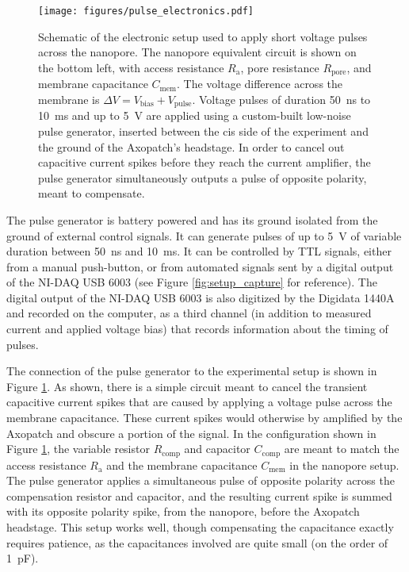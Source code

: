\begin{figure}[h]
\begin{centering}
\texttt{[image: figures/pulse\_electronics.pdf]}
\caption[Electronic setup for low-noise pulses across a nanopore]{Schematic of the electronic setup used to apply short voltage pulses across the nanopore.  The nanopore equivalent circuit is shown on the bottom left, with access resistance $R_{\text{a}}$, pore resistance $R_{\text{pore}}$, and membrane capacitance $C_{\text{mem}}$.  The voltage difference across the membrane is $\Delta V = V_{\text{bias}} + V_{\text{pulse}}$.  Voltage pulses of duration \SI{50}{\ns} to \SI{10}{\ms} and up to \SI{5}{\V} are applied using a custom-built low-noise pulse generator, inserted between the cis side of the experiment and the ground of the Axopatch's headstage.  In order to cancel out capacitive current spikes before they reach the current amplifier, the pulse generator simultaneously outputs a pulse of opposite polarity, meant to compensate.}
\label{fig:helicase_pulse_setup}
\end{centering}
\end{figure}

The pulse generator is battery powered and has its ground isolated from the ground of external control signals.  It can generate pulses of up to \SI{5}{\V} of variable duration between \SI{50}{\ns} and \SI{10}{\ms}.  It can be controlled by TTL signals, either from a manual push-button, or from automated signals sent by a digital output of the NI-DAQ USB 6003 (see Figure \ref{fig:setup_capture} for reference).  The digital output of the NI-DAQ USB 6003 is also digitized by the Digidata 1440A and recorded on the computer, as a third channel (in addition to measured current and applied voltage bias) that records information about the timing of pulses.

The connection of the pulse generator to the experimental setup is shown in Figure \ref{fig:helicase_pulse_setup}.  As shown, there is a simple circuit meant to cancel the transient capacitive current spikes that are caused by applying a voltage pulse across the membrane capacitance.  These current spikes would otherwise by amplified by the Axopatch and obscure a portion of the signal.  In the configuration shown in Figure \ref{fig:helicase_pulse_setup}, the variable resistor $R_{\text{comp}}$ and capacitor $C_{\text{comp}}$ are meant to match the access resistance $R_{\text{a}}$ and the membrane capacitance $C_{\text{mem}}$ in the nanopore setup.  The pulse generator applies a simultaneous pulse of opposite polarity across the compensation resistor and capacitor, and the resulting current spike is summed with its opposite polarity spike, from the nanopore, before the Axopatch headstage.  This setup works well, though compensating the capacitance exactly requires patience, as the capacitances involved are quite small (on the order of \SI{1}{\pico\F}).

